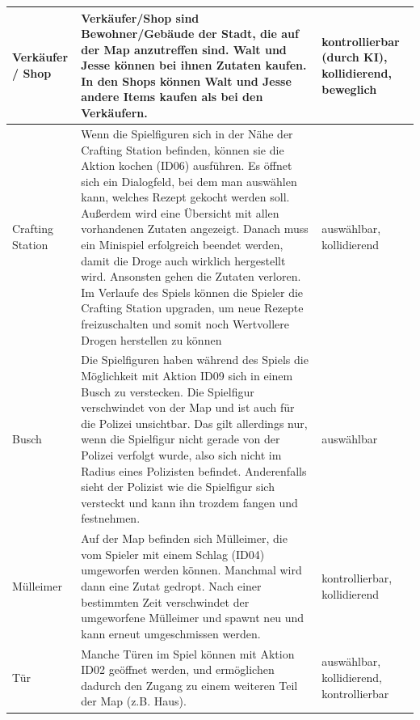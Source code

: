 \begin{tabular}{|m{1.8cm}|m{12.7cm}|m{2.5cm}|}
    \hline
    Verkäufer / Shop &
    Verkäufer/Shop sind Bewohner/Gebäude der Stadt, die auf der Map anzutreffen sind.
    Walt und Jesse können bei ihnen Zutaten kaufen.
    In den Shops können Walt und Jesse andere Items kaufen als bei den Verkäufern. &
    kontrollierbar (durch KI), kollidierend, beweglich\\
    \hline

    \hline
    Crafting Station &
    Wenn die Spielfiguren sich in der Nähe der Crafting Station befinden, können sie die Aktion kochen (ID06) ausführen.
    Es öffnet sich ein Dialogfeld, bei dem man auswählen kann, welches Rezept gekocht werden soll. Außerdem wird eine
    Übersicht mit allen vorhandenen Zutaten angezeigt. Danach muss ein Minispiel erfolgreich beendet werden, damit
    die Droge auch wirklich hergestellt wird. Ansonsten gehen die Zutaten verloren. Im Verlaufe des Spiels können die Spieler die Crafting Station upgraden,
     um neue Rezepte freizuschalten und somit noch Wertvollere Drogen herstellen zu können&
    auswählbar, kollidierend\\
    \hline

    \hline
    Busch &
    Die Spielfiguren haben während des Spiels die Möglichkeit mit Aktion ID09 sich in einem Busch zu verstecken.
    Die Spielfigur verschwindet von der Map und ist auch für die Polizei unsichtbar. Das gilt allerdings nur,
    wenn die Spielfigur nicht gerade von der Polizei verfolgt wurde, also sich nicht im Radius eines Polizisten befindet.
    Anderenfalls sieht der Polizist wie die Spielfigur sich versteckt und kann ihn trozdem fangen und festnehmen. &
    auswählbar\\
    \hline

    \hline
    Mülleimer &
    Auf der Map befinden sich Mülleimer, die vom Spieler mit einem Schlag (ID04) umgeworfen werden können. Manchmal wird dann eine Zutat gedropt.
    Nach einer bestimmten Zeit verschwindet der umgeworfene Mülleimer und spawnt neu und kann erneut umgeschmissen werden. &
    kontrollierbar, kollidierend\\
    \hline

    \hline
    Tür &
    Manche Türen im Spiel können mit Aktion ID02 geöffnet werden, und ermöglichen dadurch den Zugang zu einem weiteren Teil der Map (z.B. Haus). &
    auswählbar, kollidierend, kontrollierbar\\
    \hline



\end{tabular}

